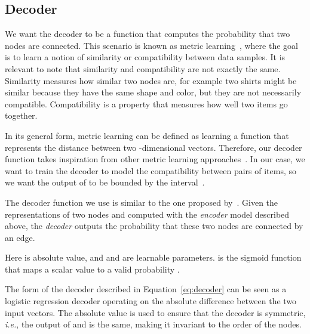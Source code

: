 \documentclass[10pt,twocolumn,letterpaper]{article}
\begin{document}
\subsection{Decoder}
\label{ssec:decoder}
We want the decoder to be a function that computes the probability that two nodes are connected. This scenario is known as metric learning~\cite{bellet2013survey}, where the goal is to learn a notion of similarity or compatibility between data samples. It is relevant to note that similarity and compatibility are not exactly the same. Similarity measures how similar two nodes are, for example two shirts might be similar because they have the same shape and color, but they are not necessarily compatible. Compatibility is a property that measures how well two items go together.


In its general form, metric learning can be defined as learning a function  that represents the distance between two -dimensional vectors. Therefore, our decoder function takes inspiration from other metric learning approaches~\cite{koch2015siamese, hoffer2015deep, snell2017prototypical}. In our case, we want to train the decoder to model the compatibility between pairs of items, so we want the output of  to be bounded by the interval~. 

The decoder function we use is similar to the one proposed by~\cite{garcia2017few}. Given the representations of two nodes  and  computed with the \emph{encoder} model described above, the \emph{decoder} outputs the probability  that these two nodes are connected by an edge.



Here  is absolute value, and  and  are learnable parameters.  is the sigmoid function that maps a scalar value to a valid 
probability .

The form of the decoder described in Equation~\ref{eq:decoder} can be seen as a logistic regression decoder operating on the absolute difference between the two input vectors. The absolute value is used to ensure that the decoder is symmetric, \textit{i.e.}, the output of  and  is the same, making it invariant to the order of the nodes.
\end{document}

